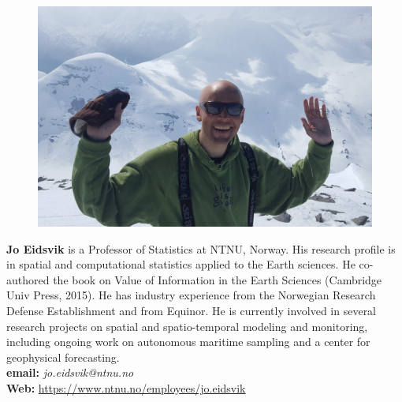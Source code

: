 \vspace{20mm}

\parbox{6.5in}{
\begin{figure} %
    \vspace{-\intextsep}
    \hspace*{-.35\columnsep}\includegraphics[scale=0.055]{fig/Eidsvikpicture.jpg}
\end{figure}
\textbf{Jo Eidsvik} is a Professor of Statistics at NTNU, Norway. His research profile is in spatial and computational statistics applied to the Earth sciences. He co-authored the book on Value of Information in the Earth Sciences (Cambridge Univ Press, 2015). He has industry experience from the Norwegian Research Defense Establishment and from Equinor. He is currently involved in several research projects on spatial and spatio-temporal modeling and monitoring, including ongoing work on autonomous maritime sampling and a center for geophysical forecasting.\\

\textbf{email: }\emph{jo.eidsvik@ntnu.no}\\
\textbf{Web: }\url{https://www.ntnu.no/employees/jo.eidsvik}
}
